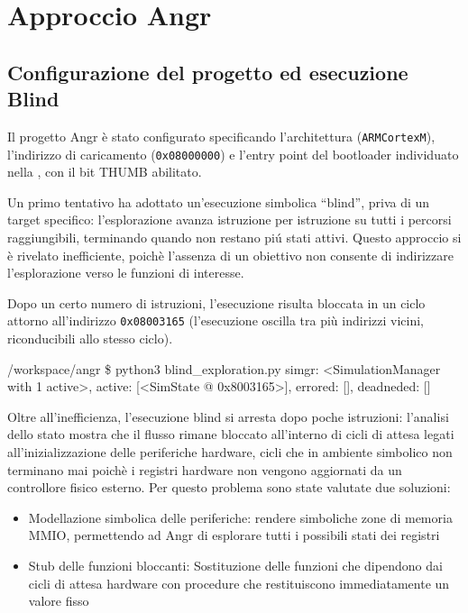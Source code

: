         \section{Approccio Angr}
        
        \subsection{Configurazione del progetto ed esecuzione 
        Blind}
        \label{subsec:esecuzione_blind_config}
        Il progetto Angr è stato configurato specificando l'architettura (\texttt{ARMCortexM}), l'indirizzo di caricamento (\texttt{0x08000000}) e l'entry point del bootloader individuato nella , con il bit THUMB abilitato.
        
        
        Un primo tentativo ha adottato un'esecuzione simbolica ``blind'', priva di un target specifico: l'esplorazione avanza istruzione per istruzione su tutti i percorsi raggiungibili, terminando quando non restano piú stati attivi. Questo approccio si è rivelato inefficiente, poichè l'assenza di un obiettivo non consente di indirizzare l'esplorazione verso le funzioni di interesse.

    
        Dopo un certo numero di istruzioni, l'esecuzione risulta bloccata in un ciclo
        attorno all'indirizzo \texttt{0x08003165} (l'esecuzione oscilla tra più
        indirizzi vicini, riconducibili allo stesso ciclo).
        \begin{bashcode}
[analysis] /workspace/angr \$ python3 blind_exploration.py 
simgr: <SimulationManager with 1 active>, active: [<SimState @ 0x8003165>], errored: [], deadneded: []
        \end{bashcode}
        

        Oltre all'inefficienza, l'esecuzione blind si arresta dopo poche istruzioni: l'analisi dello stato mostra che il flusso rimane bloccato all'interno di cicli di attesa legati all'inizializzazione delle periferiche hardware, cicli che in ambiente simbolico non terminano mai poichè i registri hardware non vengono aggiornati da un controllore fisico esterno. Per questo problema sono state valutate due soluzioni:
        \begin{itemize}
            \item Modellazione simbolica delle periferiche: rendere simboliche zone di memoria MMIO, permettendo ad Angr di esplorare tutti i possibili stati dei registri
            \item Stub delle funzioni bloccanti: Sostituzione delle funzioni che dipendono dai cicli di attesa hardware 
con procedure che restituiscono immediatamente un valore fisso
        \end{itemize}

